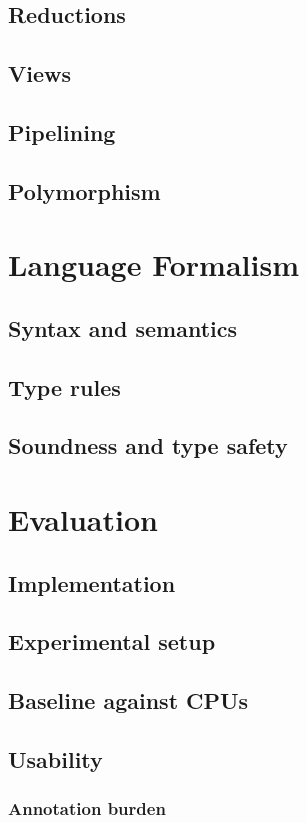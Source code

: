 \documentclass[acmsmall,review,anonymous]{acmart}\settopmatter{printfolios=true,printccs=false,printacmref=false}
\begin{document}
\subsection{Reductions}
\subsection{Views}
\subsection{Pipelining}
\subsection{Polymorphism}

\section{Language Formalism}
\subsection{Syntax and semantics}
\subsection{Type rules}
\subsection{Soundness and type safety}

\section{Evaluation}
\subsection{Implementation}
\subsection{Experimental setup}
\subsection{Baseline against CPUs}
\subsection{Usability}
\subsubsection{Annotation burden}
\end{document}
